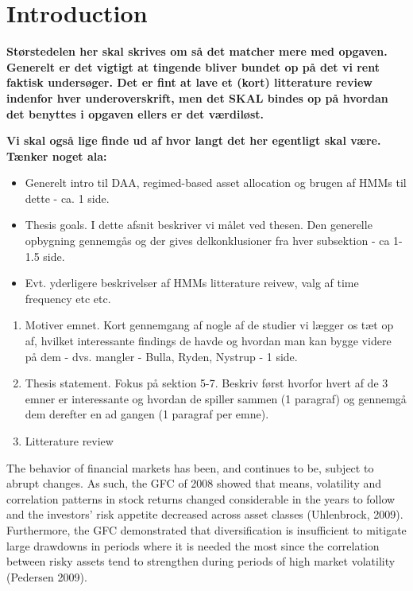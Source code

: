 \section{Introduction}
\label{section: introduction}

\textbf{Størstedelen her skal skrives om så det matcher mere med opgaven. Generelt er det vigtigt at tingende bliver bundet op på det vi rent faktisk undersøger. Det er fint at lave et (kort) litterature review indenfor hver underoverskrift, men det SKAL bindes op på hvordan det benyttes i opgaven ellers er det værdiløst.}

\textbf{Vi skal også lige finde ud af hvor langt det her egentligt skal være. Tænker noget ala:}

\begin{itemize}
    \item Generelt intro til DAA, regimed-based asset allocation og brugen af HMMs til dette - ca. 1 side.
    \item Thesis goals. I dette afsnit beskriver vi målet ved thesen. Den generelle opbygning gennemgås og der gives delkonklusioner fra hver subsektion - ca 1-1.5 side.
    \item Evt. yderligere beskrivelser af HMMs litterature reivew, valg af time frequency etc etc.
\end{itemize}

\begin{enumerate}
    \item Motiver emnet. Kort gennemgang af nogle af de studier vi lægger os tæt op af, hvilket interessante findings de havde og hvordan man kan bygge videre på dem - dvs. mangler - Bulla, Ryden, Nystrup - 1 side.
    \item Thesis statement. Fokus på sektion 5-7. Beskriv først hvorfor hvert af de 3 emner er interessante og hvordan de spiller sammen (1 paragraf) og gennemgå dem derefter en ad gangen (1 paragraf per emne).
    \item Litterature review
\end{enumerate}

The behavior of financial markets has been, and continues to be, subject to abrupt changes. As such, the GFC of 2008 showed that means, volatility and correlation patterns in stock returns changed considerable in the years to follow and the investors' risk appetite decreased across asset classes (Uhlenbrock, 2009). Furthermore, the GFC demonstrated that diversification is insufficient to mitigate large drawdowns in periods where it is needed the most since the correlation between risky assets tend to strengthen during periods of high market volatility (Pedersen 2009). 

